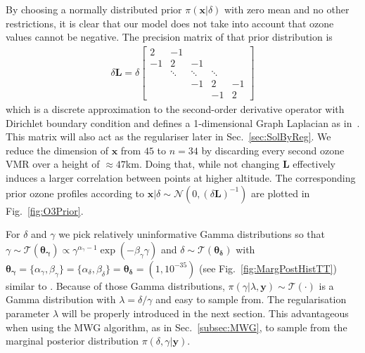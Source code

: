 By choosing a normally distributed prior $\pi(\bm{x}|\delta)$ with zero mean and no other restrictions, it is clear that our model does not take into account that ozone values cannot be negative.
The precision matrix of that prior distribution is
\begin{align}
	\delta \bm{L} =
	\delta
	\begin{bmatrix}
		2 & -1 & & &  \\
		-1 & 2 & -1 & &   \\
		& \ddots & \ddots & \ddots &\\ 
		& & -1 & 2 & -1  \\
		& & & -1 & 2 
	\end{bmatrix} 
	\label{eq:GLapl} 
\end{align}
which is a discrete approximation to the second-order derivative operator with Dirichlet boundary condition and defines a 1-dimensional Graph Laplacian as in~\cite{wang2015graphs, fox2016fast}.
This matrix will also act as the regulariser later in Sec.~\ref{sec:SolByReg}.
We reduce the dimension of $\bm{x}$ from $45$ to $n = 34$ by discarding every second ozone VMR over a height of $\approx47$km.
Doing that, while not changing $\bm{L}$ effectively induces a larger correlation between points at higher altitude.
The corresponding prior ozone profiles according to $\bm{x}| \delta \sim \mathcal{N}(0, (\delta \bm{L})^{-1})$ are plotted in Fig.~\ref{fig:O3Prior}.

For $\delta$ and $\gamma$ we pick relatively uninformative Gamma distributions so that \linebreak$\gamma \sim \mathcal{T}(\bm{\theta_{\gamma}}) \propto \gamma^{\alpha_\gamma -1 } \exp{( -\beta_\gamma \gamma) } $ and $\delta \sim \mathcal{T}(\bm{\theta_{\delta}})$ with $\bm{\theta_{\gamma}} = \{  \alpha_\gamma, \beta_\gamma\}  = \{ \alpha_\delta ,\beta_\delta\} = \bm{\theta_{\delta}} = (1,10^{-35})$ (see Fig.~\ref{fig:MargPostHistTT}) similar to \cite{fox2016fast}.
Because of those Gamma distributions, $\pi(\gamma | \lambda, \bm{y}) \sim \mathcal{T}(\cdot)$ is a Gamma distribution with $\lambda = \delta / \gamma $ and easy to sample from.
The regularisation parameter $\lambda$ will be properly introduced in the next section.
This advantageous when using the MWG algorithm, as in Sec.~\ref{subsec:MWG}, to sample from the marginal posterior distribution $\pi(\delta, \gamma | \bm{y})$.
\clearpage

